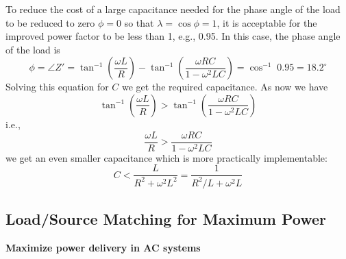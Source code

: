 \documentclass{article}
\begin{document}
To reduce the cost of a large capacitance needed for the phase angle of 
the load to be reduced to zero $\phi=0$ so that $\lambda=\cos\phi=1$, it 
is acceptable for the improved power factor to be less than 1, e.g., 0.95. 
In this case, the phase angle of the load is
\begin{equation}
  \phi=\angle Z'=\tan^{-1}\left(\frac{\omega L}{R}\right)-\tan^{-1}\left(\frac{\omega RC}{1-\omega^2 LC}\right)=\cos^{-1}\; 0.95=18.2^\circ 	
\end{equation}
Solving this equation for $C$ we get the required capacitance. As now we have
\begin{equation}
  \tan^{-1}\left(\frac{\omega L}{R}\right)>\tan^{-1}\left(\frac{\omega RC}{1-\omega^2 LC}\right) 
\end{equation}
i.e.,
\begin{equation}
  \frac{\omega L}{R}>\frac{\omega RC}{1-\omega^2 LC}	
\end{equation}
we get an even smaller capacitance which is more practically implementable:
\begin{equation}
  C<\frac{L}{R^2+\omega^2 L^2}=\frac{1}{R^2/L+\omega^2L} 
\end{equation}



\subsection*{Load/Source Matching for Maximum Power}

{\bf Maximize power delivery in AC systems}
\end{document}

